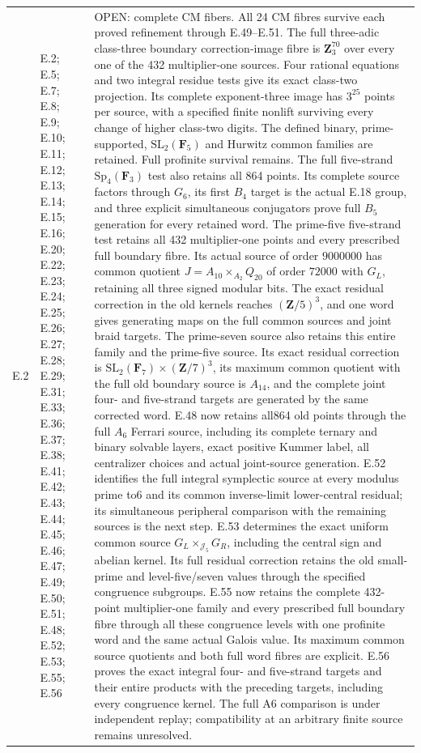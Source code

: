\begin{longtable}{@{}p{1.1cm}p{3.0cm}p{10.3cm}@{}}
E.2 & E.2; E.5; E.7; E.8; E.9; E.10; E.11; E.12; E.13; E.14; E.15; E.16; E.20; E.22; E.23; E.24; E.25; E.26; E.27; E.28; E.29; E.31; E.33; E.36; E.37; E.38; E.41; E.42; E.43; E.44; E.45; E.46; E.47; E.49; E.50; E.51; E.48; E.52; E.53; E.55; E.56 & OPEN: complete CM fibers. All 24 CM fibres survive each proved refinement through E.49--E.51. The full three-adic class-three boundary correction-image fibre is $\mathbf Z_3^{70}$ over every one of the 432 multiplier-one sources. Four rational equations and two integral residue tests give its exact class-two projection. Its complete exponent-three image has $3^{25}$ points per source, with a specified finite nonlift surviving every change of higher class-two digits. The defined binary, prime-supported, $\mathrm{SL}_2(\mathbf F_5)$ and Hurwitz common families are retained. Full profinite survival remains. The full five-strand $\mathrm{Sp}_4(\mathbf F_3)$ test also retains all 864 points. Its complete source factors through $G_6$, its first $B_4$ target is the actual E.18 group, and three explicit simultaneous conjugators prove full $B_5$ generation for every retained word. The prime-five five-strand test retains all 432 multiplier-one points and every prescribed full boundary fibre. Its actual source of order $9000000$ has common quotient $J=A_{10}\times_{A_2}Q_{20}$ of order $72000$ with $G_L$, retaining all three signed modular bits. The exact residual correction in the old kernels reaches $(\mathbf Z/5)^3$, and one word gives generating maps on the full common sources and joint braid targets. The prime-seven source also retains this entire family and the prime-five source. Its exact residual correction is $\mathrm{SL}_2(\mathbf F_7)\times(\mathbf Z/7)^3$, its maximum common quotient with the full old boundary source is $A_{14}$, and the complete joint four- and five-strand targets are generated by the same corrected word. E.48 now retains all864 old points through the full $A_6$ Ferrari source, including its complete ternary and binary solvable layers, exact positive Kummer label, all centralizer choices and actual joint-source generation. E.52 identifies the full integral symplectic source at every modulus prime to6 and its common inverse-limit lower-central residual; its simultaneous peripheral comparison with the remaining sources is the next step. E.53 determines the exact uniform common source $G_L\times_{\mathcal J_5}G_R$, including the central sign and abelian kernel. Its full residual correction retains the old small-prime and level-five/seven values through the specified congruence subgroups. E.55 now retains the complete 432-point multiplier-one family and every prescribed full boundary fibre through all these congruence levels with one profinite word and the same actual Galois value. Its maximum common source quotients and both full word fibres are explicit. E.56 proves the exact integral four- and five-strand targets and their entire products with the preceding targets, including every congruence kernel. The full A6 comparison is under independent replay; compatibility at an arbitrary finite source remains unresolved. \\

\end{longtable}
